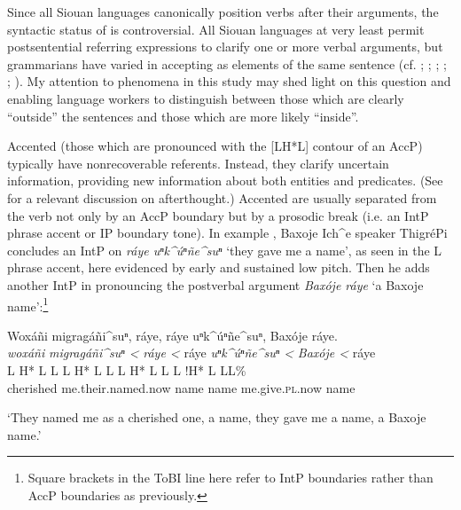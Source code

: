 \documentclass[output=paper]{LSP/langsci}
\begin{document}
Since all Siouan languages canonically position verbs after their arguments, the syntactic status of  is controversial. All Siouan languages at very least permit postsentential referring expressions to clarify one or more verbal arguments, but grammarians have varied in accepting  as elements of the same sentence (cf. \citealt{Rudin1998}; \citealt{Mithun1999}; \citealt[76]{Ingham2003}; \citealt[421]{Cumberland2005}; \citealt[292--293]{Boyle2007}; \citealt{Gordon2008}). My attention to  phenomena in this study may shed light on this question and enabling language workers to distinguish between those  which are clearly “outside” the sentences and those which are more likely “inside”.

Accented  (those which are pronounced with the [LH*L] contour of an AccP) typically have nonrecoverable referents. Instead, they clarify uncertain information, providing new information about both entities and predicates. (See \citealt[103]{Graczyk1991a} for a relevant discussion on  afterthought.) Accented  are usually separated from the verb not only by an AccP boundary but by a prosodic break (i.e. an IntP phrase accent or IP boundary tone). In example , Baxoje Ich\^{}e speaker ThigréPi concludes an IntP on \emph{ráye uⁿk\^{}úⁿñe\^{}suⁿ} `they gave me a name', as seen in the L phrase accent, here evidenced by early and sustained low pitch. Then he adds another IntP in pronouncing the postverbal argument \emph{Baxóje ráye} `a Baxoje name':\footnote{Square brackets in the ToBI line here refer to IntP boundaries rather than AccP boundaries as previously.}

\ea\label{thigrepiraye}
Woxáñi migragáñi\^{}suⁿ, ráye, ráye uⁿk\^{}úⁿñe\^{}suⁿ, Baxóje ráye.\footnotemark\\
\glll	\emph{woxáñi} 	\emph{migragáñi\^{}suⁿ <}		\emph{ráye <}	ráye		\emph{uⁿk\^{}úⁿñe\^{}suⁿ <}	\emph{Baxóje <}		ráye\\
	{\ob L H* L}		{L\cb}	{\ob L H* L L\cb}	{\ob L H* L}	{L\cb}	{\ob L !H* L} 		{L\cb{}L\%}\\
	cherished	me.their.named.now	name		name	me.give.\textsc{pl}.now				name\\

\glt	`They named me as a cherished one, a name, they gave me a name, a Baxoje name.'
\z
\end{document}
